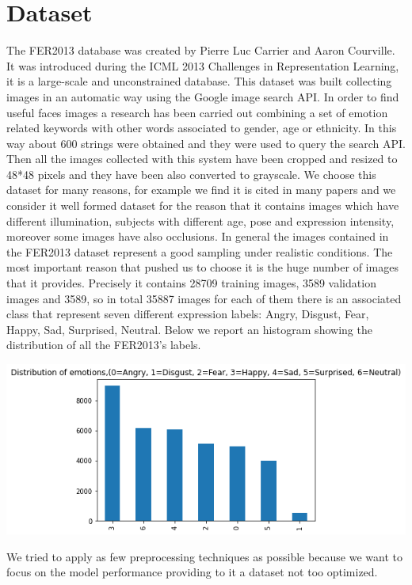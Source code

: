 \documentclass[10pt,twocolumn,letterpaper]{article}
\begin{document}
\section{Dataset}
The FER2013 database was created by Pierre Luc Carrier and Aaron Courville.
It was introduced during the ICML 2013 Challenges in Representation Learning,
it is a large-scale and unconstrained database.
This dataset was built collecting images in an automatic way using the Google image search API.
In order to find useful faces images
a research has been carried out combining a set of emotion related keywords with other words associated
to gender, age or ethnicity.
In this way about 600 strings were obtained and they were used to query the search API.
Then all the images collected with this system have been cropped and resized to 48*48 pixels
and they have been also converted to grayscale.
We choose this dataset for many reasons, for example we find it is cited in many papers and we consider it well formed dataset for the reason that it contains
images which have different illumination, subjects with different age, pose and expression intensity, moreover some images
have also occlusions. In general the images contained in the FER2013 dataset represent a good sampling under realistic conditions.
The most important reason that pushed us to choose it is the huge number of images that it provides.
Precisely it contains 28709 training images, 3589 validation images and 3589, so in total 35887
images for each of them there is an associated class that represent seven different expression labels: Angry, Disgust, Fear, Happy, Sad, Surprised, Neutral.
Below we report an histogram showing the distribution of all the FER2013's labels.
\begin{center}
   \includegraphics[width=1\linewidth]{./immagini/7_classi.png}
\end{center}
We tried to apply as few preprocessing techniques as possible because we want to focus on the model performance providing to it a dataset not too optimized.
\end{document}

